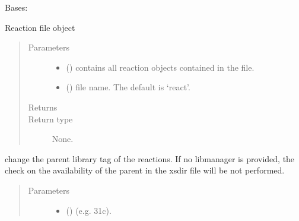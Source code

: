\documentclass[letterpaper,10pt,english]{sphinxmanual}
\begin{document}
\begin{fulllineitems}
\label{\detokenize{api/inputgeneration:parsersD1S.ReactionFile}}
\sphinxAtStartPar
Bases: 

\sphinxAtStartPar
Reaction file object
\begin{quote}\begin{description}
\item[{Parameters}] \leavevmode\begin{itemize}
\item {} 
\sphinxAtStartPar
{} () \textendash{} contains all reaction objects contained in the file.

\item {} 
\sphinxAtStartPar
{} (\sphinxstyleliteralemphasis{\sphinxupquote{, }}) \textendash{} file name. The default is ‘react’.

\end{itemize}

\item[{Returns}] \leavevmode
\sphinxAtStartPar


\item[{Return type}] \leavevmode
\sphinxAtStartPar
None.

\end{description}\end{quote}

\begin{fulllineitems}
\label{\detokenize{api/inputgeneration:parsersD1S.ReactionFile.change_lib}}
\sphinxAtStartPar
change the parent library tag of the reactions. If no libmanager is
provided, the check on the availability of the parent in the xsdir
file will be not performed.
\begin{quote}\begin{description}
\item[{Parameters}] \leavevmode\begin{itemize}
\item {} 
\sphinxAtStartPar
{} () \textendash{} (e.g. 31c).


\end{itemize}
\end{description}
\end{quote}
\end{fulllineitems}
\end{fulllineitems}
\end{document}
